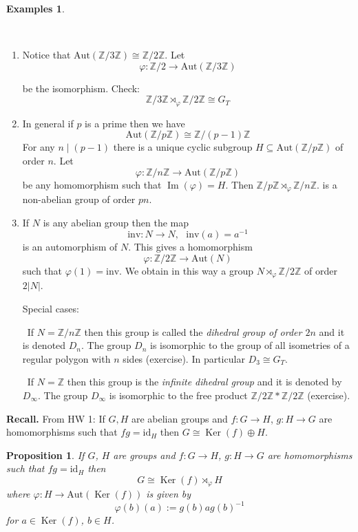 \documentclass[12pt, letterpaper, oneside]{article}
\theoremstyle{plain}
\newtheorem{proposition}[theorem]{Proposition}
\theoremstyle{definition}
\newtheorem{examples}[theorem]{Examples}
\newcommand{\Z}{{\mathbb Z}}
\newcommand{\Aut}{\mathrm{Aut}}
\newcommand{\id}{\mathrm{id}}
\newcommand{\inv}{\mathrm{inv}}
\renewcommand{\Im}{\operatorname{Im}}
\newcommand{\Ker}{\operatorname{Ker}}
\newcommand{\benu}{\begin{enumerate}}
\newcommand{\eenu}{\end{enumerate}}
\newcommand{\vs}{\vskip 5mm}
\newcommand{\isep}[1][0]{\setlength{\itemsep}{#1 mm}}
\begin{document}
\begin{examples} \ 
\label{EX_SEMIDIRPROD}


\vskip -13mm

\ 
\benu
\isep[5]
\item Notice that $\Aut(\Z/3\Z) \cong \Z/2\Z$. Let  
$$\varphi \colon \Z/2 \to \Aut(\Z/3\Z)$$

\vskip -3mm

be the isomorphism. Check: 
$$\Z/3\Z \rtimes_{\varphi} \Z/2\Z \cong G_{T}$$

\item In general if  $p$ is a prime then  we have
$$\Aut(\Z/p\Z)\cong \Z/(p-1)\Z$$
For any $n\mid (p-1)$ there is a unique cyclic subgroup $H\subseteq \Aut(\Z/p\Z)$ of order 
$n$. Let 
$$\varphi \colon \Z/n\Z \to \Aut(\Z/p\Z)$$ 
be any homomorphism such that $\Im(\varphi) = H$. Then $\Z/p\Z \rtimes_{\varphi } \Z/n\Z$.
is a non-abelian group of order $pn$.


\item If $N$ is  any abelian group then the map 
$$\inv\colon N \to N, \ \ \ \inv(a) = a^{-1}$$
is an automorphism of $N$. This gives a homomorphism 
$$\varphi \colon \Z/2\Z \to \Aut(N)$$
such that $\varphi(1) = \inv$. We obtain in this way a group $N\rtimes_{\varphi} \Z/2\Z$ 
of order $2|N|$. 

Special cases:

\textbullet \ If $N = \Z/n\Z$ then this group is called the \emph{dihedral group of order $2n$} 
and it is denoted $D_{n}$. The group  $D_{n}$ is isomorphic to the group of all isometries of a regular polygon with 
$n$ sides (exercise).  In particular $D_{3}\cong G_{T}$.

\vs

\textbullet \ If $N = \Z$ then this group is the \emph{infinite dihedral group} and it is denoted by $D_{\infty}$. 
The group $D_{\infty}$ is isomorphic to the free product $\Z/2\Z \ast \Z/2\Z$ (exercise).  


\eenu


\end{examples}




\vs\vs




\textbf{Recall.} From HW 1: If $G, H$ are abelian groups and 
$f\colon G \to H$,  $g\colon H \to G$
are homomorphisms such that $fg = \id_{H}$ then $G\cong \Ker(f)\oplus H$.


\vs\vs

\begin{proposition}
\label{PROP_SEMIDIRSPLIT}
If $G$, $H$  are  groups  and $f\colon G \to H$, $g\colon H \to G$
are homomorphisms such that $fg = \id_{H}$ then 
$$G\cong \Ker(f)\rtimes_{\varphi} H$$
where $\varphi\colon H \to \Aut(\Ker(f))$ is given by 
$$\varphi(b)(a) := g(b)ag(b)^{-1}$$
for $a\in \Ker(f)$, $b\in H$.

\end{proposition}
\end{document}
